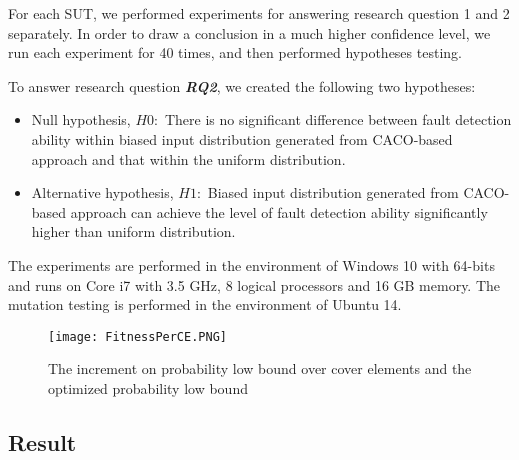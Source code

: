 \documentclass[journal]{IEEEtran}
\begin{document}
For each SUT, we performed experiments for answering research question 1 and 2 separately. In order to draw a conclusion in a much higher confidence level, we run each experiment for 40 times, and then performed hypotheses testing.

To answer research question \textbf{\emph{RQ2}}, we created the following two hypotheses:

\begin{itemize}
	\item Null hypothesis, \(H0:\) There is no significant difference between fault detection ability within biased input distribution generated from CACO-based approach and that within the uniform distribution.
	\item Alternative hypothesis, \(H1:\) Biased input distribution generated from CACO-based approach can achieve the level of fault detection ability significantly higher than uniform distribution.
\end{itemize}
 
 The experiments are performed in the environment of Windows 10 with 64-bits and runs on Core i7 with 3.5 GHz, 8 logical processors and 16 GB memory. The mutation testing is performed in the environment of Ubuntu 14. 
 
 \begin{figure}[t]
 	\hspace*{0.2cm}
 	\texttt{[image: FitnessPerCE.PNG]}
 	\caption{The increment on probability low bound over cover elements and the optimized probability low bound}
 	\label{fig:fitnessperce}
 \end{figure} 

\subsection{Result}
\end{document}
